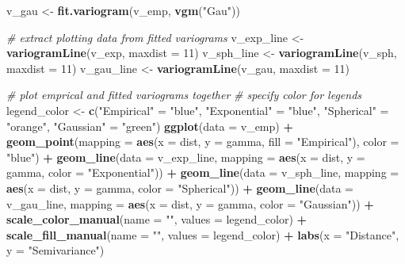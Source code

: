 \documentclass[]{book}
\newenvironment{Shaded}{\begin{snugshade}}{\end{snugshade}}
\newcommand{\CommentTok}[1]{\textcolor[rgb]{0.56,0.35,0.01}{\textit{#1}}}
\newcommand{\DataTypeTok}[1]{\textcolor[rgb]{0.13,0.29,0.53}{#1}}
\newcommand{\DecValTok}[1]{\textcolor[rgb]{0.00,0.00,0.81}{#1}}
\newcommand{\KeywordTok}[1]{\textcolor[rgb]{0.13,0.29,0.53}{\textbf{#1}}}
\newcommand{\NormalTok}[1]{#1}
\newcommand{\OperatorTok}[1]{\textcolor[rgb]{0.81,0.36,0.00}{\textbf{#1}}}
\newcommand{\StringTok}[1]{\textcolor[rgb]{0.31,0.60,0.02}{#1}}
\begin{document}
\begin{Shaded}
\begin{Highlighting}[]
\NormalTok{v_gau <-}\StringTok{ }\KeywordTok{fit.variogram}\NormalTok{(v_emp, }\KeywordTok{vgm}\NormalTok{(}\StringTok{"Gau"}\NormalTok{))}

\CommentTok{# extract plotting data from fitted variograms}
\NormalTok{v_exp_line <-}\StringTok{ }\KeywordTok{variogramLine}\NormalTok{(v_exp, }\DataTypeTok{maxdist =} \DecValTok{11}\NormalTok{)}
\NormalTok{v_sph_line <-}\StringTok{ }\KeywordTok{variogramLine}\NormalTok{(v_sph, }\DataTypeTok{maxdist =} \DecValTok{11}\NormalTok{)}
\NormalTok{v_gau_line <-}\StringTok{ }\KeywordTok{variogramLine}\NormalTok{(v_gau, }\DataTypeTok{maxdist =} \DecValTok{11}\NormalTok{)}

\CommentTok{# plot emprical and fitted variograms together  }
\CommentTok{# specify color for legends}
\NormalTok{legend_color <-}\StringTok{ }\KeywordTok{c}\NormalTok{(}\StringTok{"Empirical"}\NormalTok{ =}\StringTok{ "blue"}\NormalTok{, }\StringTok{"Exponential"}\NormalTok{ =}\StringTok{ "blue"}\NormalTok{,}
                  \StringTok{"Spherical"}\NormalTok{ =}\StringTok{ "orange"}\NormalTok{, }\StringTok{"Gaussian"}\NormalTok{ =}\StringTok{ "green"}\NormalTok{)}
\KeywordTok{ggplot}\NormalTok{(}\DataTypeTok{data =}\NormalTok{ v_emp) }\OperatorTok{+}
\StringTok{  }\KeywordTok{geom_point}\NormalTok{(}\DataTypeTok{mapping =} \KeywordTok{aes}\NormalTok{(}\DataTypeTok{x =}\NormalTok{ dist, }\DataTypeTok{y =}\NormalTok{ gamma, }\DataTypeTok{fill =} \StringTok{"Empirical"}\NormalTok{), }\DataTypeTok{color =} \StringTok{"blue"}\NormalTok{) }\OperatorTok{+}
\StringTok{  }\KeywordTok{geom_line}\NormalTok{(}\DataTypeTok{data =}\NormalTok{ v_exp_line, }\DataTypeTok{mapping =} \KeywordTok{aes}\NormalTok{(}\DataTypeTok{x =}\NormalTok{ dist, }\DataTypeTok{y =}\NormalTok{ gamma, }\DataTypeTok{color =} \StringTok{"Exponential"}\NormalTok{)) }\OperatorTok{+}
\StringTok{  }\KeywordTok{geom_line}\NormalTok{(}\DataTypeTok{data =}\NormalTok{ v_sph_line, }\DataTypeTok{mapping =} \KeywordTok{aes}\NormalTok{(}\DataTypeTok{x =}\NormalTok{ dist, }\DataTypeTok{y =}\NormalTok{ gamma, }\DataTypeTok{color =} \StringTok{"Spherical"}\NormalTok{)) }\OperatorTok{+}
\StringTok{  }\KeywordTok{geom_line}\NormalTok{(}\DataTypeTok{data =}\NormalTok{ v_gau_line, }\DataTypeTok{mapping =} \KeywordTok{aes}\NormalTok{(}\DataTypeTok{x =}\NormalTok{ dist, }\DataTypeTok{y =}\NormalTok{ gamma, }\DataTypeTok{color =} \StringTok{"Gaussian"}\NormalTok{)) }\OperatorTok{+}
\StringTok{  }\KeywordTok{scale_color_manual}\NormalTok{(}\DataTypeTok{name =} \StringTok{""}\NormalTok{, }\DataTypeTok{values =}\NormalTok{ legend_color) }\OperatorTok{+}
\StringTok{  }\KeywordTok{scale_fill_manual}\NormalTok{(}\DataTypeTok{name =} \StringTok{""}\NormalTok{, }\DataTypeTok{values =}\NormalTok{ legend_color) }\OperatorTok{+}
\StringTok{  }\KeywordTok{labs}\NormalTok{(}\DataTypeTok{x =} \StringTok{"Distance"}\NormalTok{,}
       \DataTypeTok{y =} \StringTok{"Semivariance"}\NormalTok{)}
\end{Highlighting}
\end{Shaded}
\end{document}
